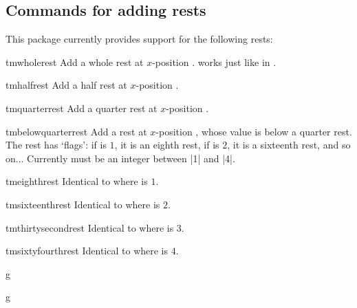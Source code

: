 \documentclass[11pt,a4paper]{ltxdoc}
\begin{document}
\subsection{Commands for adding rests}\label{sec:music-notes:rests}
This package currently provides support for the following rests:
\begin{docCommand}{tmwholerest}{}
  Add a whole rest at $x$-position .  works just like in 
  .
\end{docCommand}
\begin{docCommand}{tmhalfrest}{}
  Add a half rest at $x$-position .
\end{docCommand}
\begin{docCommand}{tmquarterrest}{}
  Add a quarter rest at $x$-position .
\end{docCommand}
\begin{docCommand}{tmbelowquarterrest}{}
  Add a rest at $x$-position , whose value is below a quarter rest. 
  The rest has  `flags': if  is $1$, it is an eighth 
  rest, if  is $2$, it is a sixteenth rest, and so on... Currently 
   must be an integer between |1| and |4|.
\end{docCommand}
\begin{docCommand}{tmeighthrest}{}
  Identical to  where  is $1$.
\end{docCommand}
\begin{docCommand}{tmsixteenthrest}{}
  Identical to  where  is $2$.
\end{docCommand}
\begin{docCommand}{tmthirtysecondrest}{}
  Identical to  where  is $3$.
\end{docCommand}
\begin{docCommand}{tmsixtyfourthrest}{}
  Identical to  where  is $4$.
\end{docCommand}
\begin{dispExample}
\begin{tmmultiplestaves}[0pt]%
  \begin{tmstaff}{g}
  \end{tmstaff}%
  \begin{tmstaff}{g}
  \end{tmstaff}%
\end{tmmultiplestaves}
\end{dispExample}
\end{document}
